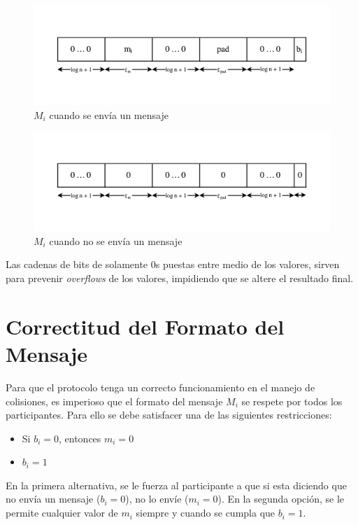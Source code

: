 \begin{figure}[H]
  \centering
    \includegraphics[width=1\textwidth]{imagenes/message-format(1).pdf}
  \caption{$M_i$ cuando se envía un mensaje}
  \label{fig:M_sending}
\end{figure}

\begin{figure}[H]
  \centering
    \includegraphics[width=1\textwidth]{imagenes/message-format-nomessage.pdf}
  \caption{$M_i$ cuando no se envía un mensaje}
  \label{fig:M_not_sending}
\end{figure}

Las cadenas de bits de solamente 0s puestas entre medio de los valores, sirven para 
prevenir \emph{overflows} de los valores, impidiendo que se altere el resultado 
final.

\section{Correctitud del Formato del Mensaje}

Para que el protocolo tenga un correcto funcionamiento en el manejo de colisiones, 
es imperioso que el formato del mensaje $M_i$ se respete por todos los participantes. 
Para ello se debe satisfacer una de las siguientes restricciones:
\begin{itemize}
    \item Si $b_i = 0$, entonces $m_i = 0$
    \item $b_i = 1$
\end{itemize}

En la primera alternativa, se le fuerza al participante a que si esta diciendo que 
no envía un mensaje ($b_i = 0$), no lo envíe ($m_i = 0$). En la segunda opción, se 
le permite cualquier valor de $m_i$ siempre y cuando se cumpla que $b_i = 1$.

